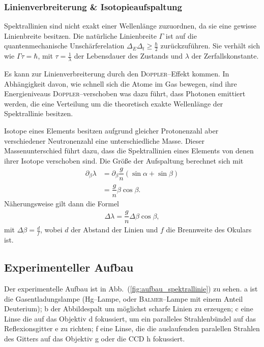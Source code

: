 \documentclass[sn-mathphys-num,iicol]{sn-jnl}
\theoremstyle{thmstyleone}
\theoremstyle{thmstyletwo}
\theoremstyle{thmstylethree}
\begin{document}
\subsubsection{Linienverbreiterung \& Isotopieaufspaltung}
Spektrallinien sind nicht exakt einer Wellenlänge zuzuordnen, da sie eine gewisse Linienbreite besitzen.
Die natürliche Linienbreite $\Gamma $ ist auf die quantenmechanische Unschärferelation $\Delta _E\Delta _t \geq \tfrac{\hbar }{2}$ zurückzuführen.
Sie verhält sich wie $\Gamma \tau =\hbar $, mit $\tau =\tfrac{1}{\lambda }$ der Lebensdauer des Zustands und $\lambda $ der Zerfallskonstante.

Es kann zur Linienverbreiterung durch den \textsc{Doppler}--Effekt kommen.
In Abhängigkeit davon, wie schnell sich die Atome im Gas bewegen, sind ihre Energieniveaus \textsc{Doppler}--verschoben was dazu führt, dass Photonen emittiert werden, die eine Verteilung um die theoretisch exakte Wellenlänge der Spektrallinie besitzen.

Isotope eines Elements besitzen aufgrund gleicher Protonenzahl aber verschiedener Neutronenzahl eine unterschiedliche Masse.
Dieser Massenunterschied führt dazu, dass die Spektrallinien eines Elements von denen ihrer Isotope verschoben sind.
Die Größe der Aufspaltung berechnet sich mit 
\begin{align} 
         &&&& \partial _\beta \lambda  &= \partial _\beta\dfrac{g}{n}\left(\sin \alpha +\sin \beta \right)  &&&& \\
          &&&&  &= \dfrac{g}{n}\beta \cos \beta .  &&&& 
\end{align} 
Näherungsweise gilt dann die Formel
\begin{align} 
        \Delta \lambda =\dfrac{g}{n}\Delta \beta \cos \beta
,\end{align} 
mit $\Delta \beta =\tfrac{d}{f}$, wobei $d$ der Abstand der Linien und $f$ die Brennweite des Okulars ist.

\subsection{Experimenteller Aufbau}
Der experimentelle Aufbau ist in Abb.\ (\ref{fig:aufbau_spektrallinie}) zu sehen.
a ist die Gasentladungslampe (Hg--Lampe, oder \textsc{Balmer}--Lampe mit einem Anteil Deuterium); b der Abbildespalt um möglichst scharfe Linien zu erzeugen; c eine Linse die auf das Objektiv d fokussiert, um ein paralleles Strahlenbündel auf das Reflexionsgitter e zu richten; f eine Linse, die die auslaufenden paralellen Strahlen des Gitters auf das Objektiv g oder die CCD h fokussiert.
\end{document}
